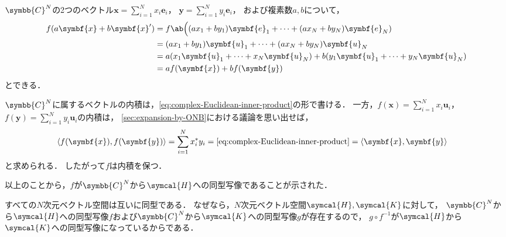 \documentclass[
]{sotsu}
\begin{document}
\quad 
$\symbb{C}^N$の2つのベクトル$\symbf{x} = \sum_{i = 1}^{N} x_i \symbf{e}_i$，
$\symbf{y} = \sum_{i = 1}^{N} y_i \symbf{e}_i$，
および複素数$a, b$について，
\begin{equation*}
    \begin{split}
        f(a \symbf{x} + b \symbf{x}')
            &= f \ab\Big(
                    (a x_1 + b y_1) \symbf{e}_1
                    + \dots + 
                    (a x_N + b y_N) \symbf{e}_N
                )
            \\
            &= (a x_1 + b y_1) \symbf{u}_1
                + \dots + 
                (a x_N + b y_N) \symbf{u}_N
            \\
            &= a (x_1 \symbf{u}_1 + \dots + x_N \symbf{u}_N)
             + b (y_1 \symbf{u}_1 + \dots + y_N \symbf{u}_N)
            \\
            &= a f(\symbf{x}) + b f(\symbf{y})
    \end{split}
\end{equation*}
とできる．


\quad
$\symbb{C}^N$に属するベクトルの内積は，\cref{eq:complex-Euclidean-inner-product}の形で書ける．
一方，$f(\symbf{x}) = \sum_{i = 1}^{N} x_i \symbf{u}_i$，
$f(\symbf{y}) = \sum_{i = 1}^{N} y_i \symbf{u}_i$の内積は，
\cref{sec:expansion-by-ONB}における議論を思い出せば，
\begin{equation*}
    \begin{split}
        \iparen{ f(\symbf{x}), f(\symbf{y}) }
        &= \sum_{i = 1}^{N} \conj{x_i} y_i
        = \text{\cref{eq:complex-Euclidean-inner-product}}
        = \iparen{\symbf{x}, \symbf{y}}
    \end{split}
\end{equation*}
と求められる．
したがって$f$は内積を保つ．


以上のことから，$f$が$\symbb{C}^N$から$\symcal{H}$への同型写像であることが示された．
\hfill\qedsymbol

\vspace{\baselineskip}

すべての$N$次元ベクトル空間は互いに同型である．
なぜなら，$N$次元ベクトル空間$\symcal{H}, \symcal{K}$に対して，
$\symbb{C}^N$から$\symcal{H}$への同型写像$f$および$\symbb{C}^N$から$\symcal{K}$への同型写像$g$が存在するので，
$g \circ f^{-1}$が$\symcal{H}$から$\symcal{K}$への同型写像になっているからである．
\end{document}
